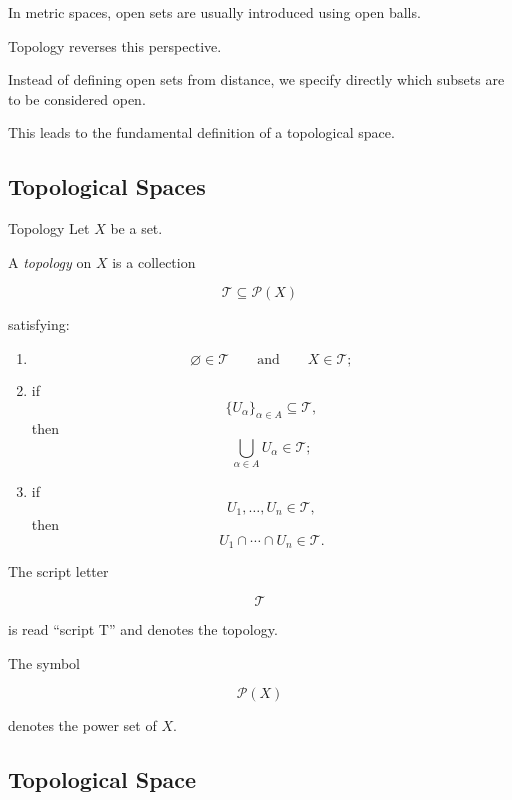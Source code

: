 In metric spaces, open sets are usually introduced using open balls.

Topology reverses this perspective.

Instead of defining open sets from distance, we specify directly which
subsets are to be considered open.

This leads to the fundamental definition of a topological space.

\subsection{Topological Spaces}
\label{subsec:topological-spaces}

\begin{definitionbox}{Topology}
Let \(X\) be a set.

A \emph{topology} on \(X\) is a collection

\[
\boxed{
\mathcal{T}\subseteq\mathcal{P}(X)
}
\]

satisfying:

\begin{enumerate}
    \item
    \[
    \varnothing\in\mathcal{T}
    \qquad\text{and}\qquad
    X\in\mathcal{T};
    \]

    \item if
    \[
    \{U_\alpha\}_{\alpha\in A}
    \subseteq\mathcal{T},
    \]
    then
    \[
    \bigcup_{\alpha\in A}U_\alpha\in\mathcal{T};
    \]

    \item if
    \[
    U_1,\ldots,U_n\in\mathcal{T},
    \]
    then
    \[
    U_1\cap\cdots\cap U_n\in\mathcal{T}.
    \]
\end{enumerate}
\end{definitionbox}

The script letter

\[
\mathcal{T}
\]

is read ``script T'' and denotes the topology.

The symbol

\[
\mathcal{P}(X)
\]

denotes the power set of \(X\).

\subsection{Topological Space}
\label{subsec:topological-space-pair}


